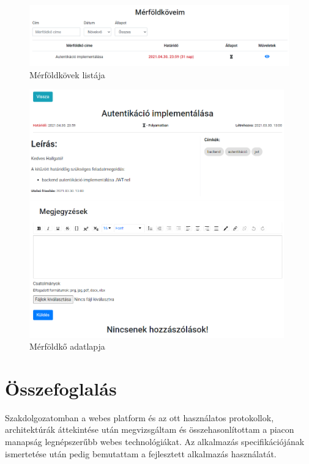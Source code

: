 \documentclass[
]{thesis-ekf}
\theoremstyle{definition}
\theoremstyle{remark}
\begin{document}
	\begin{figure}[!h]
		\centering
		\includegraphics[width=12cm]{kepek/screenshots/hallgato_merfoldko_lista.png}
		\caption{Mérföldkövek listája}
		\label{fig:hallgato_merfoldko_lista}
	\end{figure}
	
	\begin{figure}[!h]
		\centering
		\includegraphics[width=11cm]{kepek/screenshots/hallgato_merfoldko_adatlap.png}
		\caption{Mérföldkő adatlapja}
		\label{fig:hallgato_merfoldko_adatlap}
	\end{figure}
	
	\chapter{Összefoglalás}
	Szakdolgozatomban a webes platform és az ott használatos protokollok, architektúrák áttekintése után megvizsgáltam és összehasonlítottam a piacon manapság legnépszerűbb webes technológiákat. Az alkalmazás specifikációjának ismertetése után pedig bemutattam a fejlesztett alkalmazás használatát.
	
\end{document}
